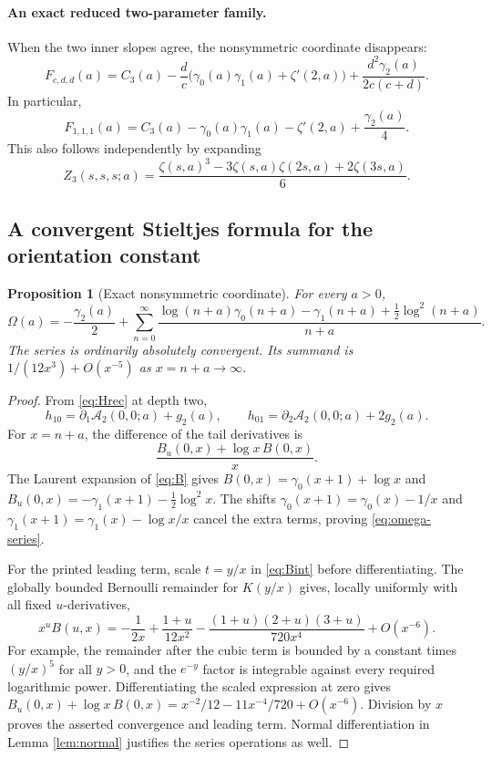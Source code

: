 \documentclass[11pt,a4paper]{article}
\numberwithin{equation}{section}
\newtheorem{proposition}[theorem]{Proposition}
\theoremstyle{definition}\newtheorem{definition}[theorem]{Definition}
\theoremstyle{remark}\newtheorem{remark}[theorem]{Remark}
\newcommand{\Atail}{\mathcal A}
\begin{document}
\paragraph{An exact reduced two-parameter family.}
When the two inner slopes agree, the nonsymmetric coordinate disappears:
\begin{equation}\label{eq:equalinner}
 F_{c,d,d}(a)=C_3(a)-\frac dc
      \bigl(\gamma_0(a)\gamma_1(a)+\zeta'(2,a)\bigr)
       +\frac{d^2\gamma_2(a)}{2c(c+d)}.
\end{equation}
In particular,
\begin{equation}\label{eq:diagonaltriple}
 F_{1,1,1}(a)=C_3(a)-\gamma_0(a)\gamma_1(a)
                    -\zeta'(2,a)+\frac{\gamma_2(a)}4.
\end{equation}
This also follows independently by expanding
\[
 Z_3(s,s,s;a)=\frac{\zeta(s,a)^3-3\zeta(s,a)\zeta(2s,a)
                                  +2\zeta(3s,a)}6.
\]

\subsection{A convergent Stieltjes formula for the orientation constant}

\begin{proposition}[Exact nonsymmetric coordinate]\label{prop:omega}
For every $a>0$,
\begin{equation}\label{eq:omega-series}
 \boxed{\displaystyle
 \Omega(a)= -\frac{\gamma_2(a)}2+
 \sum_{n=0}^\infty
 \frac{\log(n+a)\gamma_0(n+a)-\gamma_1(n+a)
                    +\tfrac12\log^2(n+a)}{n+a}.}
\end{equation}
The series is ordinarily absolutely convergent. Its summand is
$1/(12x^3)+O(x^{-5})$ as $x=n+a\to\infty$.
\end{proposition}
\begin{proof}
From \eqref{eq:Hrec} at depth two,
\[
 h_{10}=\partial_1\Atail_2(0,0;a)+g_2(a),\qquad
 h_{01}=\partial_2\Atail_2(0,0;a)+2g_2(a).
\]
For $x=n+a$, the difference of the tail derivatives is
\[
 \frac{B_u(0,x)+\log x\,B(0,x)}x.
\]
The Laurent expansion of \eqref{eq:B} gives
$B(0,x)=\gamma_0(x+1)+\log x$ and
$B_u(0,x)=-\gamma_1(x+1)-\tfrac12\log^2x$.
The shifts
$\gamma_0(x+1)=\gamma_0(x)-1/x$ and
$\gamma_1(x+1)=\gamma_1(x)-\log x/x$ cancel the extra terms, proving
\eqref{eq:omega-series}.

For the printed leading term, scale $t=y/x$ in \eqref{eq:Bint}
before differentiating. The globally bounded Bernoulli remainder for
$K(y/x)$ gives, locally uniformly with all fixed $u$-derivatives,
\[
 x^uB(u,x)=-\frac1{2x}+\frac{1+u}{12x^2}
       -\frac{(1+u)(2+u)(3+u)}{720x^4}+O(x^{-6}).
\]
For example, the remainder after the cubic term is bounded by a constant
times $(y/x)^5$ for all $y>0$, and the $e^{-y}$ factor is integrable
against every required logarithmic power. Differentiating the scaled
expression at zero gives
$B_u(0,x)+\log x\,B(0,x)=x^{-2}/12-11x^{-4}/720+O(x^{-6})$.
Division by $x$ proves the asserted convergence and leading term.
Normal differentiation in Lemma \ref{lem:normal} justifies the series
operations as well.
\end{proof}
\end{document}
